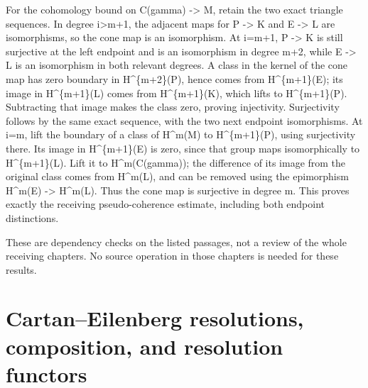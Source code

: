 \documentclass[11pt]{article}
\begin{document}
For the cohomology bound on C(gamma)\allowbreak{} \allowbreak{}-> M,\allowbreak{} retain the two exact triangle sequences. In degree i>m\allowbreak{}+1,\allowbreak{} the adjacent maps for P \allowbreak{}-> K and E \allowbreak{}-> L are isomorphisms,\allowbreak{} so the cone map is an isomorphism. At i\allowbreak{}=m\allowbreak{}+1,\allowbreak{} P \allowbreak{}-> K is still surjective at the left endpoint and is an isomorphism in degree m\allowbreak{}+2,\allowbreak{} while E \allowbreak{}-> L is an isomorphism in both relevant degrees. A class in the kernel of the cone map has zero boundary in H\textasciicircum{}\{m\allowbreak{}+2\}(P)\allowbreak{},\allowbreak{} hence comes from H\textasciicircum{}\{m\allowbreak{}+1\}(E)\allowbreak{}; its image in H\textasciicircum{}\{m\allowbreak{}+1\}(L)\allowbreak{} comes from H\textasciicircum{}\{m\allowbreak{}+1\}(K)\allowbreak{},\allowbreak{} which lifts to H\textasciicircum{}\{m\allowbreak{}+1\}(P)\allowbreak{}. Subtracting that image makes the class zero,\allowbreak{} proving injectivity. Surjectivity follows by the same exact sequence,\allowbreak{} with the two next endpoint isomorphisms. At i\allowbreak{}=m,\allowbreak{} lift the boundary of a class of H\textasciicircum{}m(M)\allowbreak{} to H\textasciicircum{}\{m\allowbreak{}+1\}(P)\allowbreak{},\allowbreak{} using surjectivity there. Its image in H\textasciicircum{}\{m\allowbreak{}+1\}(E)\allowbreak{} is zero,\allowbreak{} since that group maps isomorphically to H\textasciicircum{}\{m\allowbreak{}+1\}(L)\allowbreak{}. Lift it to H\textasciicircum{}m(C(gamma)\allowbreak{})\allowbreak{}; the difference of its image from the original class comes from H\textasciicircum{}m(L)\allowbreak{},\allowbreak{} and can be removed using the epimorphism H\textasciicircum{}m(E)\allowbreak{} \allowbreak{}-> H\textasciicircum{}m(L)\allowbreak{}. Thus the cone map is surjective in degree m. This proves exactly the receiving pseudo-coherence estimate,\allowbreak{} including both endpoint distinctions.

These are dependency checks on the listed passages,\allowbreak{} not a review of the whole receiving chapters. No source operation in those chapters is needed for these results.
\clearpage
\section{\texorpdfstring{Cartan–\allowbreak{}Eilenberg resolutions,\allowbreak{} composition,\allowbreak{} and resolution functors}{   and resolution functors}}\label{proofs-7096-7578-cartaneilenberg-resolutions-composition-and-resolution-functors}
\end{document}

